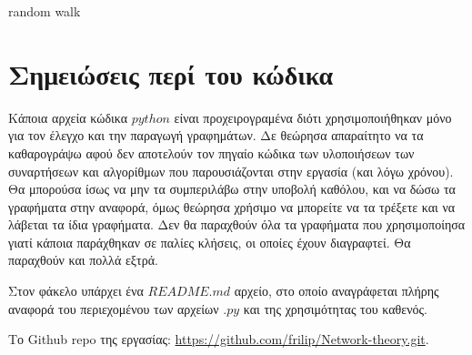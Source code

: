 \documentclass[12pt, letterpaper]{article}
\newcommand{\en}{\selectlanguage{english}}
\newcommand{\gr}{\selectlanguage{greek}}
\begin{document}
random walk





\section{Σημειώσεις περί του κώδικα}

Κάποια αρχεία κώδικα $python$ είναι προχειρογραμένα διότι χρησιμοποιήθηκαν μόνο για τον έλεγχο και την παραγωγή γραφημάτων.
Δε θεώρησα απαραίτητο να τα καθαρογράψω αφού δεν αποτελούν τον πηγαίο κώδικα των υλοποιήσεων των συναρτήσεων και αλγορίθμων 
που παρουσιάζονται στην εργασία (και λόγω χρόνου). Θα μπορούσα ίσως να μην τα συμπεριλάβω στην υποβολή καθόλου, και να δώσω τα γραφήματα 
στην αναφορά, όμως θεώρησα χρήσιμο να μπορείτε να τα τρέξετε και να λάβεται τα ίδια γραφήματα. Δεν θα παραχθούν όλα 
τα γραφήματα που χρησιμοποίησα γιατί κάποια παράχθηκαν σε παλίες κλήσεις, οι οποίες έχουν διαγραφτεί. Θα παραχθούν και πολλά εξτρά.

Στον φάκελο υπάρχει ένα $README.md$ αρχείο, στο οποίο αναγράφεται πλήρης αναφορά του περιεχομένου των αρχείων $.py$ 
και της χρησιμότητας του καθενός. 

Το \textlatin{Github repo} της εργασίας: \en \href{https://github.com/frilip/Network-theory.git}{https://github.com/frilip/Network-theory.git}.

\gr

\renewcommand{\refname}{\selectlanguage{greek} Αναφορές}  


\end{document}
